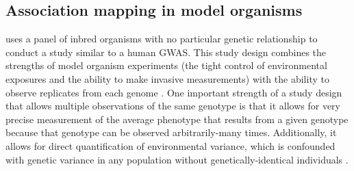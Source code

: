 \subsection{Association mapping in model organisms} uses a panel of inbred organisms with no particular genetic relationship to conduct a study similar to a human GWAS.
	This study design combines the strengths of model organism experiments (the tight control of environmental exposures and the ability to make invasive measurements) with the ability to observe replicates from each genome \citep{Payseur2007a,Kang2008,Kirby2010a}.
	One important strength of a study design that allows multiple observations of the same genotype is that it allows for very precise measurement of the average phenotype that results from a given genotype because that genotype can be observed arbitrarily-many times.
	Additionally, it allows for direct quantification of environmental variance, which is confounded with genetic variance in any population without genetically-identical individuals \citep{Falconer1965,Lynch1998}.

	

